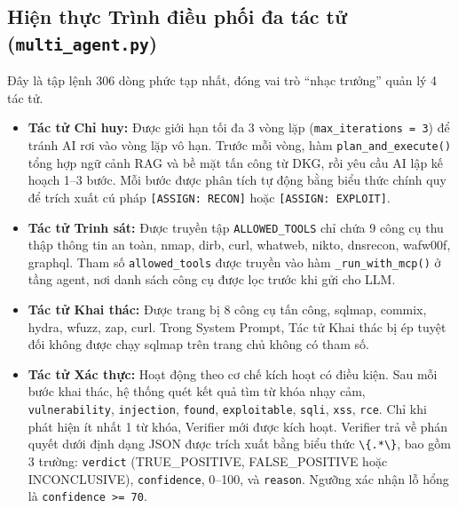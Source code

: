 \subsection{Hiện thực Trình điều phối đa tác tử (\texttt{multi\_agent.py})}
Đây là tập lệnh 306 dòng phức tạp nhất, đóng vai trò ``nhạc trưởng'' quản lý 4 tác tử.
\begin{itemize}
    \item \textbf{Tác tử Chỉ huy:} Được giới hạn tối đa 3 vòng lặp (\texttt{max\_iterations = 3}) để tránh AI rơi vào vòng lặp vô hạn. Trước mỗi vòng, hàm \texttt{plan\_and\_execute()} tổng hợp ngữ cảnh RAG và bề mặt tấn công từ DKG, rồi yêu cầu AI lập kế hoạch 1--3 bước. Mỗi bước được phân tích tự động bằng biểu thức chính quy để trích xuất cú pháp \texttt{[ASSIGN: RECON]} hoặc \texttt{[ASSIGN: EXPLOIT]}.
    \item \textbf{Tác tử Trinh sát:} Được truyền tập \texttt{ALLOWED\_TOOLS} chỉ chứa 9 công cụ thu thập thông tin an toàn, nmap, dirb, curl, whatweb, nikto, dnsrecon, wafw00f, graphql. Tham số \texttt{allowed\_tools} được truyền vào hàm \texttt{\_run\_with\_mcp()} ở tầng agent, nơi danh sách công cụ được lọc trước khi gửi cho LLM.
    \item \textbf{Tác tử Khai thác:} Được trang bị 8 công cụ tấn công, sqlmap, commix, hydra, wfuzz, zap, curl. Trong System Prompt, Tác tử Khai thác bị ép tuyệt đối không được chạy sqlmap trên trang chủ không có tham số.
    \item \textbf{Tác tử Xác thực:} Hoạt động theo cơ chế kích hoạt có điều kiện. Sau mỗi bước khai thác, hệ thống quét kết quả tìm từ khóa nhạy cảm, \texttt{vulnerability}, \texttt{injection}, \texttt{found}, \texttt{exploitable}, \texttt{sqli}, \texttt{xss}, \texttt{rce}. Chỉ khi phát hiện ít nhất 1 từ khóa, Verifier mới được kích hoạt. Verifier trả về phán quyết dưới định dạng JSON được trích xuất bằng biểu thức \texttt{\textbackslash\{.*\textbackslash\}}, bao gồm 3 trường: \texttt{verdict} (TRUE\_POSITIVE, FALSE\_POSITIVE hoặc INCONCLUSIVE), \texttt{confidence}, 0--100, và \texttt{reason}. Ngưỡng xác nhận lỗ hổng là \texttt{confidence >= 70}.
\end{itemize}

